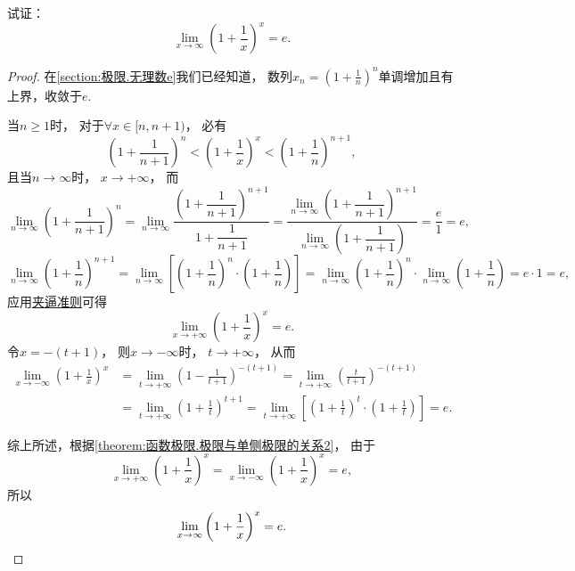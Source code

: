 \begin{example}[重要极限II]
试证：\begin{equation}
	\lim_{x \to \infty} \left(1+\frac1x\right)^x = e.
\end{equation}
\begin{proof}
在\cref{section:极限.无理数e}我们已经知道，
数列\(x_n = \left(1+\frac1n\right)^n\)单调增加且有上界，收敛于\(e\).

当\(n\geq1\)时，
对于\(\forall x\in[n,n+1)\)，
必有\[
	\left(1+\frac1{n+1}\right)^n
	< \left(1+\frac1x\right)^x
	< \left(1+\frac1n\right)^{n+1},
\]
且当\(n\to\infty\)时，
\(x\to+\infty\)，
而\[
	\lim_{n\to\infty} \left(1+\frac1{n+1}\right)^n
	= \lim_{n\to\infty} \frac{\left(1+\dfrac1{n+1}\right)^{n+1}}{1+\dfrac1{n+1}}
	= \frac{\lim\limits_{n\to\infty} \left(1+\dfrac1{n+1}\right)^{n+1}}{\lim\limits_{n\to\infty} \left(1+\dfrac1{n+1}\right)}
	= \frac{e}1
	= e,
\]\[
	\lim_{n\to\infty} \left(1+\frac1n\right)^{n+1}
	= \lim_{n\to\infty} \left[\left(1+\frac1n\right)^n\cdot\left(1+\frac1n\right)\right]
	= \lim_{n\to\infty} \left(1+\frac1n\right)^n \cdot \lim_{n\to\infty} \left(1+\frac1n\right)
	= e \cdot 1
	= e,
\]
应用\hyperref[theorem:函数极限.夹逼准则]{夹逼准则}可得\[
	\lim_{x\to+\infty} \left(1+\frac1x\right)^x = e.
\]
令\(x=-(t+1)\)，
则\(x\to-\infty\)时，
\(t\to+\infty\)，
从而\begin{align*}
	\lim_{x\to-\infty} \left(1+\frac1x\right)^x
	&= \lim_{t\to+\infty} \left(1-\frac{1}{t+1}\right)^{-(t+1)}
	= \lim_{t\to+\infty} \left(\frac{t}{t+1}\right)^{-(t+1)} \\
	&= \lim_{t\to+\infty} \left(1+\frac1t\right)^{t+1}
	= \lim_{t\to+\infty} \left[\left(1+\frac1t\right)^t\cdot\left(1+\frac1t\right)\right]
	= e.
\end{align*}

综上所述，根据\cref{theorem:函数极限.极限与单侧极限的关系2}，
由于\[
	\lim_{x\to+\infty}\left(1+\frac1x\right)^x
	= \lim_{x\to-\infty}\left(1+\frac1x\right)^x
	= e,
\]
所以\[
	\lim_{x\to\infty} \left(1+\frac1x\right)^x = e.
	\qedhere
\]
\end{proof}
\end{example}
